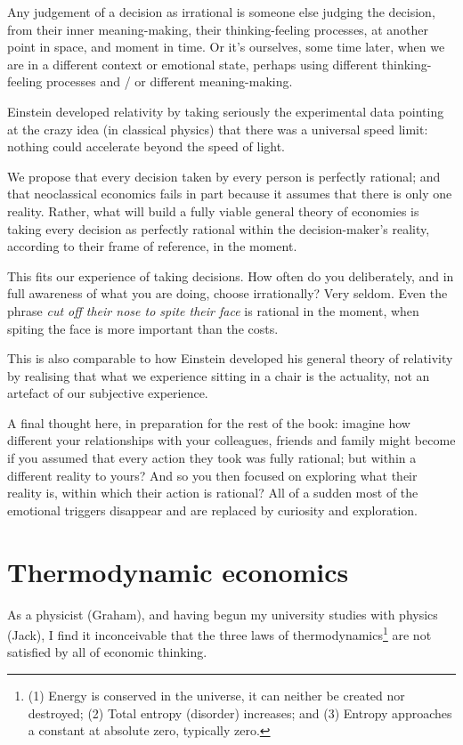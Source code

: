 Any judgement of a decision as irrational is someone else judging the decision, from their inner meaning-making, their thinking-feeling processes, at another point in space, and moment in time. Or it’s ourselves, some time later, when we are in a different context or emotional state, perhaps using different thinking-feeling processes and / or different meaning-making.


Einstein developed relativity by taking seriously the experimental data pointing at the crazy idea (in classical physics)  that there was a universal speed limit: nothing could accelerate beyond the speed of light. 


We propose that every decision taken by every person is perfectly rational; and that  neoclassical economics  fails in part because it assumes that there is only one reality. Rather, what will build a fully viable general theory of economies  is taking every decision as perfectly rational within the decision-maker’s reality, according to their frame of reference, in the moment. 


This fits our experience of taking decisions. How often do you deliberately, and in full awareness of what you are doing, choose irrationally? Very seldom. Even the phrase \emph{cut off their nose to spite their face} is rational in the moment, when spiting the face is more important than the costs. 


This is also comparable to how Einstein  developed his general theory of relativity  by realising that what we experience sitting in a chair is the actuality, not an artefact of our subjective experience. 


A final thought here, in preparation for the rest of the book: imagine how different your relationships with your colleagues, friends and family might become if you assumed that every action they took was fully rational; but within a different reality to yours? And so you then focused on exploring what their reality is, within which their action is rational? All of a sudden most of the emotional triggers disappear and are replaced by curiosity and exploration.








\section{Thermodynamic economics}
As a physicist (Graham), and having begun my university studies with physics (Jack), I find it inconceivable that the three laws of thermodynamics\footnote{(1) Energy is conserved in the universe, it can neither be created nor destroyed; (2) Total entropy (disorder) increases; and (3) Entropy approaches a constant at absolute zero, typically zero. } are not satisfied by all of economic thinking.  


